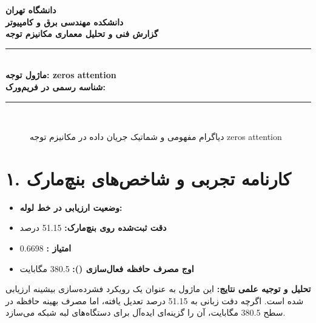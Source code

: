 \documentclass[12pt,a4paper]{article}
\begin{document}
\begin{center}
{\Large\bfseries دانشگاه تهران}\\[0.2cm]
{\large\bfseries دانشکده مهندسی برق و کامپیوتر}\\[0.2cm]
{\large\bfseries گزارش فنی و تحلیل معماری مکانیزم توجه}\\[0.5cm]
\rule{\linewidth}{1pt}\\[0.3cm]
{\LARGE\bfseries ماژول توجه: zeros attention}\\[0.2cm]
{\large \textbf{شناسه رسمی در فریم‌ورک:} }\\[0.2cm]
\rule{\linewidth}{1pt}\\[0.5cm]
\end{center}

\begin{figure}[H]
\centering
{}
\caption{دیاگرام مفهومی و شماتیک جریان داده در مکانیزم توجه zeros attention}
\end{figure}

\section*{۱. کارنامه تجربی و شاخص‌های بنچ‌مارک}
\begin{itemize}
\item \textbf{وضعیت ارزیابی در خط لوله:} 
\item \textbf{دقت ثبت‌شده روی بنچ‌مارک:} 51.15 درصد
\item \textbf{امتیاز :} 0.6698
\item \textbf{اوج مصرف حافظه فعال‌سازی ():} 380.5 مگابایت
\end{itemize}
\textbf{تحلیل و توجیه علمی نتایج:} این ماژول به عنوان یک رویکرد فشرده‌سازی بیشینه ارزیابی شده است. اگرچه دقت زبانی به 51.15 درصد تعدیل یافته، اما مصرف بهینه حافظه در سطح 380.5 مگابایت، آن را گزینه‌ای ایده‌آل برای دستگاه‌های لبه شبکه می‌سازد.
\end{document}
